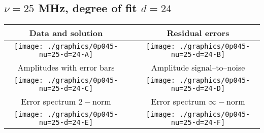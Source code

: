 

% 

\clearpage{}
\break{}

\subsection{$\nu = 25$ MHz, degree of fit $d = 24$}

\begin{table}[h]
    \begin{center}
        \begin{tabular}{ccc}
            Data and solution & \quad & Residual errors \\\hline
            \texttt{[image: ./graphics/0p045-nu=25-d=24-A]} &&
            \texttt{[image: ./graphics/0p045-nu=25-d=24-B]} \\[15pt]
            Amplitudes with error bars && Amplitude signal--to--noise \\\hline
            \texttt{[image: ./graphics/0p045-nu=25-d=24-C]} &&
            \texttt{[image: ./graphics/0p045-nu=25-d=24-D]} \\[15pt]
            Error spectrum $2-$norm && Error spectrum $\infty-$norm \\\hline
            \texttt{[image: ./graphics/0p045-nu=25-d=24-E]} &&
            \texttt{[image: ./graphics/0p045-nu=25-d=24-F]} \\[15pt]
        \end{tabular}
    \end{center}
\label{fig:elev=45, nu=25}
\end{table}



\endinput
